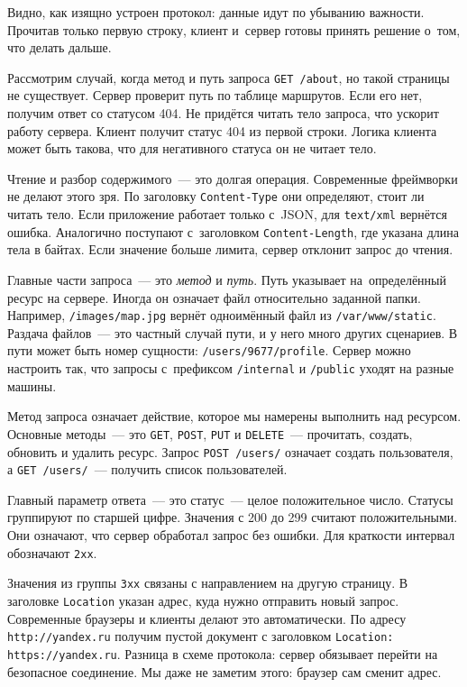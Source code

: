 Видно, как изящно устроен протокол: данные идут по убыванию важности. Прочитав
только первую строку, клиент и~сервер готовы принять решение о~том, что делать
дальше.


Рассмотрим случай, когда метод и путь запроса \verb|GET /about|, но
такой страницы не существует. Сервер проверит путь по таблице маршрутов. Если
его нет, получим ответ со статусом 404. Не придётся читать тело запроса, что
ускорит работу сервера. Клиент получит статус 404 из первой строки. Логика
клиента может быть такова, что для негативного статуса он не читает тело.

Чтение и разбор содержимого~--- это долгая операция. Современные фреймворки не
делают этого зря. По заголовку \verb|Content-Type| они определяют, стоит ли
читать тело. Если приложение работает только с~JSON, для \verb|text/xml|
вернётся ошибка. Аналогично поступают с~заголовком \verb|Content-Length|, где
указана длина тела в байтах. Если значение больше лимита, сервер отклонит запрос
до чтения.

Главные части запроса~--- это \emph{метод} и \emph{путь}. Путь указывает
на~определённый ресурс на сервере. Иногда он означает файл относительно заданной
папки. Например, \verb|/images/map.jpg| вернёт одноимённый файл из
\verb|/var/www/static|. Раздача файлов~--- это частный случай пути, и у него много других
сценариев. В пути может быть номер сущности: \verb|/users/9677/profile|. Сервер
можно настроить так, что запросы с~префиксом \verb|/internal| и \verb|/public|
уходят на разные машины.

Метод запроса означает действие, которое мы намерены выполнить над
ресурсом. Основные методы~--- это \verb|GET|, \verb|POST|, \verb|PUT| и
\verb|DELETE|~--- прочитать, создать, обновить и удалить ресурс. Запрос
\verb|POST /users/| означает создать пользователя, а \verb|GET /users/|~---
получить список пользователей.

Главный параметр ответа~--- это статус~--- целое положительное число. Статусы
группируют по старшей цифре. Значения с 200 до 299 считают положительными. Они
означают, что сервер обработал запрос без ошибки. Для краткости интервал
обозначают \verb|2хх|.

Значения из группы \verb|3хх| связаны с направлением на другую страницу. В
заголовке \verb|Location| указан адрес, куда нужно отправить новый
запрос. Современные браузеры и клиенты делают это автоматически. По адресу
\verb|http://yandex.ru| получим пустой документ с заголовком
\verb|Location: https://yandex.ru|. Разница в схеме протокола:
сервер обязывает перейти на безопасное соединение. Мы даже не заметим этого:
браузер сам сменит адрес.

